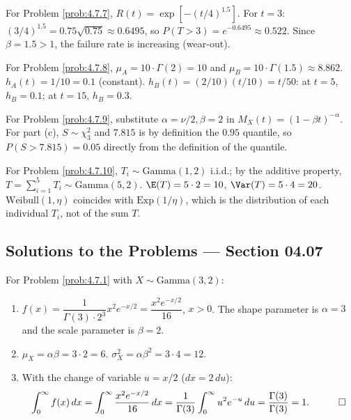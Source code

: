 \begin{sugerencia}
	\label{sug:4.7.7}
	For Problem \ref{prob:4.7.7}, $R(t)=\exp[-(t/4)^{1.5}]$. For $t=3$: $(3/4)^{1.5}=0.75\sqrt{0.75}\approx 0.6495$, so $P(T>3)=e^{-0.6495}\approx 0.522$. Since $\beta=1.5>1$, the failure rate is increasing (wear-out).
\end{sugerencia}

\begin{sugerencia}
	\label{sug:4.7.8}
	For Problem \ref{prob:4.7.8}, $\mu_A = 10\cdot\Gamma(2)=10$ and $\mu_B=10\cdot\Gamma(1.5)\approx 8.862$. $h_A(t)=1/10=0.1$ (constant). $h_B(t)=(2/10)(t/10)=t/50$: at $t=5$, $h_B=0.1$; at $t=15$, $h_B=0.3$.
\end{sugerencia}

\begin{sugerencia}
	\label{sug:4.7.9}
	For Problem \ref{prob:4.7.9}, substitute $\alpha=\nu/2,\beta=2$ in $M_X(t)=(1-\beta t)^{-\alpha}$. For part (c), $S\sim\chi^{2}_{3}$ and $7.815$ is by definition the $0.95$ quantile, so $P(S>7.815)=0.05$ directly from the definition of the quantile.
\end{sugerencia}

\begin{sugerencia}
	\label{sug:4.7.10}
	For Problem \ref{prob:4.7.10}, $T_i \sim \text{Gamma}(1,2)$ i.i.d.; by the additive property, $T=\sum_{i=1}^{5}T_i \sim \text{Gamma}(5,2)$. $\E(T)=5\cdot 2=10$, $\Var(T)=5\cdot 4=20$. $\text{Weibull}(1,\eta)$ coincides with $\text{Exp}(1/\eta)$, which is the distribution of each individual $T_i$, not of the sum $T$.
\end{sugerencia}

\subsection*{Solutions to the Problems --- Section 04.07}

\begin{solucion}
	\label{sol:4.7.1}
	For Problem \ref{prob:4.7.1} with $X \sim \text{Gamma}(3,2)$:
	\begin{enumerate}
		\item $f(x) = \dfrac{1}{\Gamma(3)\cdot 2^{3}}x^{2}e^{-x/2} = \dfrac{x^{2}e^{-x/2}}{16}$, $x>0$. The shape parameter is $\alpha=3$ and the scale parameter is $\beta=2$.
		\item $\mu_X = \alpha\beta = 3\cdot 2 = 6$. $\sigma_X^{2} = \alpha\beta^{2} = 3\cdot 4 = 12$.
		\item With the change of variable $u=x/2$ ($dx=2\,du$):
		\begin{align*}
			\int_0^\infty f(x)\,dx = \int_0^\infty \frac{x^{2}e^{-x/2}}{16}\,dx = \frac{1}{\Gamma(3)}\int_0^\infty u^{2}e^{-u}\,du = \frac{\Gamma(3)}{\Gamma(3)} = 1. \quad \qedhere
		\end{align*}
	\end{enumerate}
\end{solucion}

